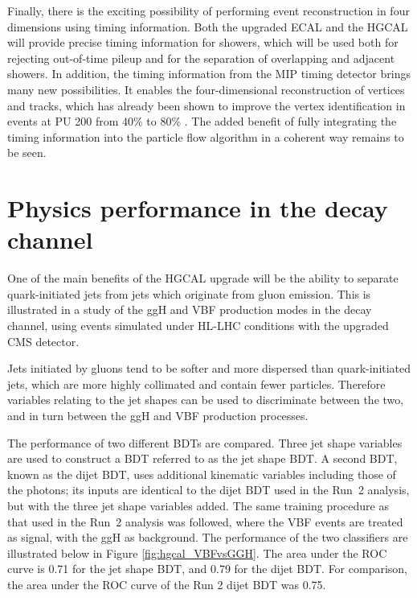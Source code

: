 Finally, there is the exciting possibility of performing event reconstruction in four dimensions using timing information.
Both the upgraded ECAL and the HGCAL will provide precise timing information for showers, 
which will be used both for rejecting out-of-time pileup and for the separation of overlapping and adjacent showers.
In addition, the timing information from the MIP timing detector brings many new possibilities. 
It enables the four-dimensional reconstruction of vertices and tracks, 
which has already been shown to improve the vertex identification in \Hgg events at PU 200 from 40\% to 80\% \cite{MTD}.
The added benefit of fully integrating the timing information into the particle flow algorithm in a coherent way remains to be seen.

\section{Physics performance in the \Hgg decay channel}
\label{sec:hgcal_physics}

One of the main benefits of the HGCAL upgrade 
will be the ability to separate quark-initiated jets from jets which originate from gluon emission.
This is illustrated in a study of the ggH and VBF production modes in the \Hgg decay channel, 
using events simulated under HL-LHC conditions with the upgraded CMS detector.

Jets initiated by gluons tend to be softer and more dispersed than quark-initiated jets, 
which are more highly collimated and contain fewer particles. 
Therefore variables relating to the jet shapes can be used to discriminate between the two, 
and in turn between the ggH and VBF production processes.

The performance of two different BDTs are compared. 
Three jet shape variables are used to construct a BDT referred to as the jet shape BDT.
A second BDT, known as the dijet BDT, uses additional kinematic variables including those of the photons; 
its inputs are identical to the dijet BDT used in the Run~2 analysis, but with the three jet shape variables added.
The same training procedure as that used in the Run~2 analysis was followed, 
where the VBF events are treated as signal, with the ggH as background.
The performance of the two classifiers are illustrated below in Figure \ref{fig:hgcal_VBFvsGGH}.
The area under the ROC curve is 0.71 for the jet shape BDT, and 0.79 for the dijet BDT.
For comparison, the area under the ROC curve of the Run 2 dijet BDT was 0.75.

